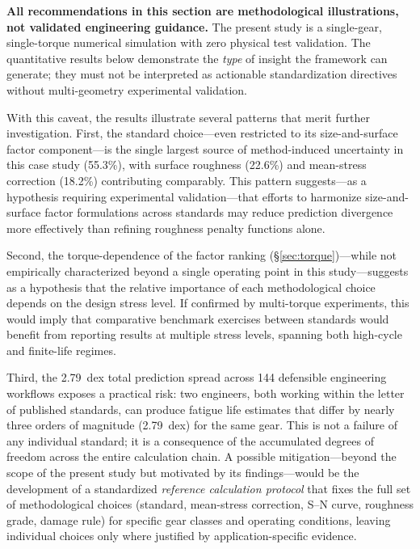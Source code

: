 \documentclass[twocolumn,12pt,a4paper]{article}
\begin{document}
\textbf{All recommendations in this section are methodological
illustrations, not validated engineering guidance.} The present study
is a single-gear, single-torque numerical simulation with zero
physical test validation. The quantitative results below demonstrate
the \emph{type} of insight the framework can generate; they must not
be interpreted as actionable standardization directives without
multi-geometry experimental validation.

With this caveat, the results illustrate several patterns that merit
further investigation. First, the standard choice---even restricted to
its size-and-surface factor component---is the single largest source
of method-induced uncertainty in this case study (55.3\%), with
surface roughness (22.6\%) and mean-stress correction (18.2\%)
contributing comparably. This pattern suggests---as a hypothesis
requiring experimental validation---that efforts to harmonize
size-and-surface factor formulations across standards may reduce
prediction divergence more effectively than refining roughness penalty
functions alone.

Second, the torque-dependence of the factor ranking
(\S\ref{sec:torque})---while not empirically characterized beyond a
single operating point in this study---suggests as a hypothesis that
the relative importance of each methodological choice depends on the
design stress level. If confirmed by multi-torque experiments, this
would imply that comparative benchmark exercises between standards
would benefit from reporting results at multiple stress levels,
spanning both high-cycle and finite-life regimes.

Third, the 2.79~dex total prediction spread across 144 defensible
engineering workflows exposes a practical risk: two engineers, both
working within the letter of published standards, can produce fatigue
life estimates that differ by nearly three orders of magnitude (2.79~dex) for the same
gear. This is not a failure of any individual standard; it is a
consequence of the accumulated degrees of freedom across the entire
calculation chain. A possible mitigation---beyond the scope of the
present study but motivated by its findings---would be the development
of a standardized \emph{reference calculation protocol} that fixes the
full set of methodological choices (standard, mean-stress correction,
S--N curve, roughness grade, damage rule) for specific gear classes and
operating conditions, leaving individual choices only where justified
by application-specific evidence.
\end{document}
